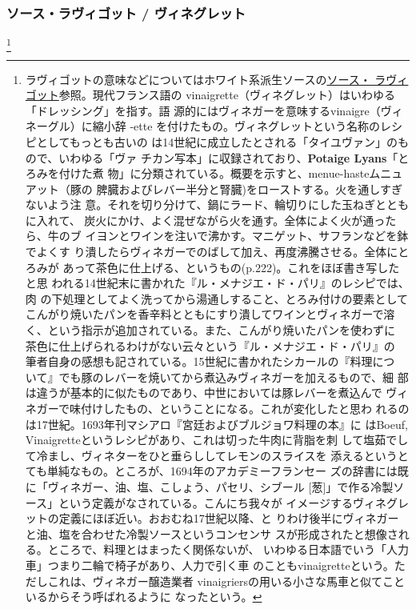 \begin{recette}
\maeaki

\hypertarget{sauce-ravigote-froide}{%
\subsubsection{ソース・ラヴィゴット /
ヴィネグレット}\label{sauce-ravigote-froide}}

\footnote{ラヴィゴットの意味などについてはホワイト系派生ソースの\protect\hyperlink{sauce-ravigote}{ソース・
  ラヴィゴット}参照。現代フランス語の
  vinaigrette（ヴィネグレット）はいわゆる「ドレッシング」を指す。語
  源的にはヴィネガーを意味するvinaigre（ヴィネーグル）に縮小辞 -ette
  を付けたもの。ヴィネグレットという名称のレシピとしてもっとも古いの
  は14世紀に成立したとされる「タイユヴァン」のもので、いわゆる「ヴァ
  チカン写本」に収録されており、\textbf{Potaige Lyans}「とろみを付けた煮
  物」に分類されている。概要を示すと、menue-hasteムニュアット（豚の
  脾臓およびレバー半分と腎臓)をローストする。火を通しすぎないよう注
  意。それを切り分けて、鍋にラード、輪切りにした玉ねぎとともに入れて、
  炭火にかけ、よく混ぜながら火を通す。全体によく火が通ったら、牛のブ
  イヨンとワインを注いで沸かす。マニゲット、サフランなどを鉢でよくす
  り潰したらヴィネガーでのばして加え、再度沸騰させる。全体にとろみが
  あって茶色に仕上げる、というもの(p.222)。これをほぼ書き写したと思
  われる14世紀末に書かれた『ル・メナジエ・ド・パリ』のレシピでは、肉
  の下処理としてよく洗ってから湯通しすること、とろみ付けの要素として
  こんがり焼いたパンを香辛料とともにすり潰してワインとヴィネガーで溶
  く、という指示が追加されている。また、こんがり焼いたパンを使わずに
  茶色に仕上げられるわけがない云々という『ル・メナジエ・ド・パリ』の
  筆者自身の感想も記されている。15世紀に書かれたシカールの『料理につ
  いて』でも豚のレバーを焼いてから煮込みヴィネガーを加えるもので、細
  部は違うが基本的に似たものであり、中世においては豚レバーを煮込んで
  ヴィネガーで味付けしたもの、ということになる。これが変化したと思わ
  れるのは17世紀。1693年刊マシアロ『宮廷およびブルジョワ料理の本』に
  はBoeuf, Vinaigretteというレシピがあり、これは切った牛肉に背脂を刺
  して塩茹でして冷まし、ヴィネターをひと垂らししてレモンのスライスを
  添えるというとても単純なもの。ところが、1694年のアカデミーフランセー
  ズの辞書には既に「ヴィネガー、油、塩、こしょう、パセリ、シブール
  {[}葱{]}」で作る冷製ソース」という定義がなされている。こんにち我々が
  イメージするヴィネグレットの定義にほぼ近い。おおむね17世紀以降、と
  りわけ後半にヴィネガーと油、塩を合わせた冷製ソースというコンセンサ
  スが形成されたと想像される。ところで、料理とはまったく関係ないが、
  いわゆる日本語でいう「人力車」つまり二輪で椅子があり、人力で引く車
  のこともvinaigretteという。ただしこれは、ヴィネガー醸造業者
  vinaigriersの用いる小さな馬車と似てこといるからそう呼ばれるように
  なったという。}


\end{recette}
